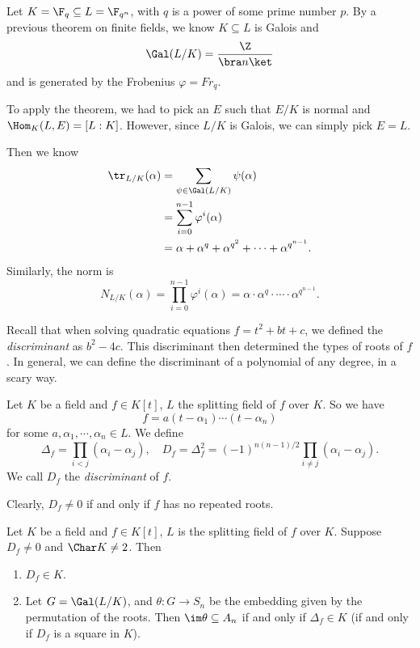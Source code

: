 \documentclass[a4paper]{article}
\begin{document}
\begin{eg}
  Let $K = \F_q \subseteq L = \F_{q^n}$, with $q$ is a power of some prime number $p$. By a previous theorem on finite fields, we know $K \subseteq L$ is Galois and
  \[
    \Gal(L/K) = \frac{\Z}{\bra n\ket}
  \]
  and is generated by the Frobenius $\varphi = Fr_q$.

  To apply the theorem, we had to pick an $E$ such that $E/K$ is normal and $\Hom_K(L, E) = [L:K]$. However, since $L/K$ is Galois, we can simply pick $E = L$.

  Then we know
  \begin{align*}
    \tr_{L/K}(\alpha) &= \sum_{\psi \in \Gal(L/K)} \psi(\alpha) \\
    &= \sum_{i = 0}^{n - 1} \varphi^i (\alpha)\\
    &= \alpha + \alpha^q + \alpha^{q^2} + \cdots + \alpha^{q^{n - 1}}.
  \end{align*}
  Similarly, the norm is
  \[
    N_{L/K}(\alpha) = \prod_{i = 0}^{n - 1} \varphi^i (\alpha) = \alpha\cdot \alpha^q \cdot \cdots \cdot \alpha^{q^{n - 1}}.
  \]
\end{eg}

Recall that when solving quadratic equations $f = t^2 + bt + c$, we defined the \emph{discriminant} as $b^2 - 4c$. This discriminant then determined the types of roots of $f$. In general, we can define the discriminant of a polynomial of any degree, in a scary way.

\begin{defi}[Discriminant]
  Let $K$ be a field and $f \in K[t]$, $L$ the splitting field of $f$ over $K$. So we have
  \[
    f = a(t - \alpha_1)\cdots(t - \alpha_n)
  \]
  for some $a, \alpha_1, \cdots, \alpha_n \in L$. We define
  \[
    \Delta_f = \prod_{i < j}(\alpha_i - \alpha_j),\quad D_f = \Delta_f^2 = (-1)^{n(n - 1)/2} \prod_{i \not= j} (\alpha_i - \alpha_j).
  \]
  We call $D_f$ the \emph{discriminant} of $f$.
\end{defi}
Clearly, $D_f \not= 0$ if and only if $f$ has no repeated roots.

\begin{thm}
  Let $K$ be a field and $f \in K[t]$, $L$ is the splitting field of $f$ over $K$. Suppose $D_f \not= 0$ and $\Char K \not= 2$. Then
  \begin{enumerate}
    \item $D_f \in K$.
    \item Let $G = \Gal(L/K)$, and $\theta: G \to S_n$ be the embedding given by the permutation of the roots. Then $\im \theta \subseteq A_n$ if and only if $\Delta_f \in K$ (if and only if $D_f$ is a square in $K$).
  \end{enumerate}
\end{thm}
\end{document}
